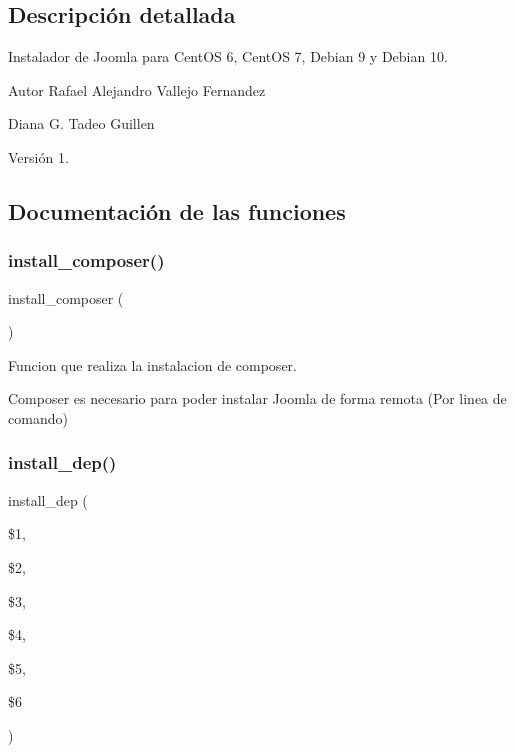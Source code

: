 \subsection{Descripción detallada}
Instalador de Joomla para Cent\+OS 6, Cent\+OS 7, Debian 9 y Debian 10. 

\begin{DoxyAuthor}{Autor}
Rafael Alejandro Vallejo Fernandez 

Diana G. Tadeo Guillen 
\end{DoxyAuthor}
\begin{DoxyVersion}{Versión}
1. 
\end{DoxyVersion}


\subsection{Documentación de las funciones}
\mbox{\label{Joomla__Instalador__General_8sh_a9cbb91389a71b89c6cab0848d688e423}} 
\subsubsection{\texorpdfstring{install\+\_\+composer()}{install\_composer()}}
{\footnotesize\ttfamily install\+\_\+composer (\begin{DoxyParamCaption}{ }\end{DoxyParamCaption})}



Funcion que realiza la instalacion de composer. 

Composer es necesario para poder instalar Joomla de forma remota (Por linea de comando) \mbox{\label{Joomla__Instalador__General_8sh_a0def5b6b697b8869c4772673d56a5a4a}} 
\subsubsection{\texorpdfstring{install\+\_\+dep()}{install\_dep()}}
{\footnotesize\ttfamily install\+\_\+dep (\begin{DoxyParamCaption}\item[{}]{\$1,  }\item[{}]{\$2,  }\item[{}]{\$3,  }\item[{}]{\$4,  }\item[{}]{\$5,  }\item[{}]{\$6 }\end{DoxyParamCaption})}



